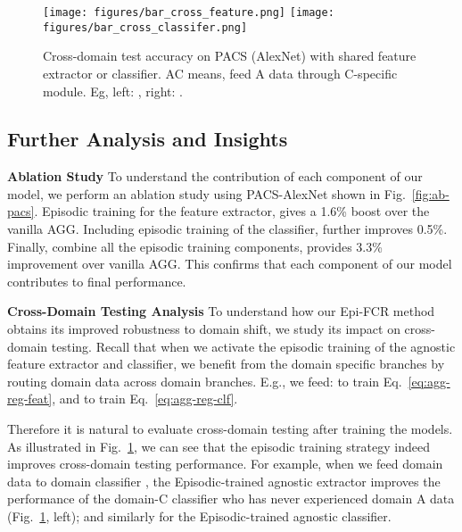 \documentclass[10pt,twocolumn,letterpaper]{article}
\newcommand{\keypoint}[1]{\vspace{0.1cm}\noindent\textbf{#1}\quad}
\newcommand{\cut}[1]{}
\begin{document}
\begin{figure}[t]
    \centering
\texttt{[image: figures/bar\_cross\_feature.png]}
\texttt{[image: figures/bar\_cross\_classifer.png]}
\vspace{-0.3cm}
    \caption{\small Cross-domain test accuracy on PACS (AlexNet) with shared feature extractor or classifier. AC means, feed A data through C-specific module. Eg, left: , right: .}
    \label{fig:cross-domain-test-acc}
    \vspace{-0.3cm}
\end{figure}






\subsection{Further Analysis and Insights}
\keypoint{Ablation Study} To understand the contribution of each component of our model, we perform an ablation study using PACS-AlexNet shown in Fig.~\ref{fig:ab-pacs}. Episodic training for the feature extractor, gives a 1.6\% boost over the vanilla AGG. Including episodic training of the classifier, further improves 0.5\%. Finally, combine all the episodic training components, provides 3.3\% improvement over vanilla AGG. This confirms that each component of our model contributes to  final performance. 

\keypoint{Cross-Domain Testing Analysis} To understand how our Epi-FCR method obtains its improved robustness to domain shift, we study its impact on cross-domain testing. Recall that when we activate the episodic training of the agnostic feature extractor and classifier, we benefit from the domain specific branches by routing domain  data across domain  branches. E.g., we feed:  to train Eq.~\ref{eq:agg-reg-feat}, and  to train Eq.~\ref{eq:agg-reg-clf}. 

Therefore it is natural to evaluate cross-domain testing after training the models. As illustrated in Fig.~\ref{fig:cross-domain-test-acc}\cut{\footnote{To save space we only display the leave-photo-out split. The others are consistent with these observations.}}, we can see that the episodic training strategy indeed improves cross-domain testing performance. For example, when we feed domain  data to domain  classifier , the Episodic-trained agnostic extractor  improves the performance of the domain-C classifier who has never experienced domain A data (Fig.~\ref{fig:cross-domain-test-acc}, left); and similarly for the Episodic-trained agnostic classifier.  
\end{document}
